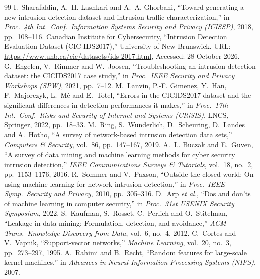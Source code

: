 \documentclass[12pt,a4paper,oneside]{report}
\begin{document}
\begin{singlespace}
\begin{thebibliography}{99}
\small
\setlength{\itemsep}{2pt}
 I.~Sharafaldin, A.~H. Lashkari and A.~A. Ghorbani, ``Toward generating a new intrusion detection dataset and intrusion traffic characterization,'' in \textit{Proc.\ 4th Int.\ Conf.\ Information Systems Security and Privacy (ICISSP)}, 2018, pp.~108--116.
 Canadian Institute for Cybersecurity, ``Intrusion Detection Evaluation Dataset (CIC-IDS2017),'' University of New Brunswick. URL: \url{https://www.unb.ca/cic/datasets/ids-2017.html}, Accessed: 28 October 2026.
 G.~Engelen, V.~Rimmer and W.~Joosen, ``Troubleshooting an intrusion detection dataset: the CICIDS2017 case study,'' in \textit{Proc.\ IEEE Security and Privacy Workshops (SPW)}, 2021, pp.~7--12.
 M.~Lanvin, P.-F. Gimenez, Y.~Han, F.~Majorczyk, L.~M\'e and E.~Totel, ``Errors in the CICIDS2017 dataset and the significant differences in detection performances it makes,'' in \textit{Proc.\ 17th Int.\ Conf.\ Risks and Security of Internet and Systems (CRiSIS)}, LNCS, Springer, 2022, pp.~18--33.
 M.~Ring, S.~Wunderlich, D.~Scheuring, D.~Landes and A.~Hotho, ``A survey of network-based intrusion detection data sets,'' \textit{Computers \& Security}, vol.~86, pp.~147--167, 2019.
 A.~L. Buczak and E.~Guven, ``A survey of data mining and machine learning methods for cyber security intrusion detection,'' \textit{IEEE Communications Surveys \& Tutorials}, vol.~18, no.~2, pp.~1153--1176, 2016.
 R.~Sommer and V.~Paxson, ``Outside the closed world: On using machine learning for network intrusion detection,'' in \textit{Proc.\ IEEE Symp.\ Security and Privacy}, 2010, pp.~305--316.
 D.~Arp \textit{et al.}, ``Dos and don'ts of machine learning in computer security,'' in \textit{Proc.\ 31st USENIX Security Symposium}, 2022.
 S.~Kaufman, S.~Rosset, C.~Perlich and O.~Stitelman, ``Leakage in data mining: Formulation, detection, and avoidance,'' \textit{ACM Trans.\ Knowledge Discovery from Data}, vol.~6, no.~4, 2012.
 C.~Cortes and V.~Vapnik, ``Support-vector networks,'' \textit{Machine Learning}, vol.~20, no.~3, pp.~273--297, 1995.
 A.~Rahimi and B.~Recht, ``Random features for large-scale kernel machines,'' in \textit{Advances in Neural Information Processing Systems (NIPS)}, 2007.

\end{thebibliography}
\end{singlespace}
\end{document}
